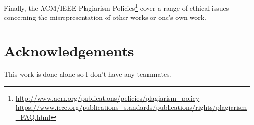 \documentclass[conference]{IEEEtran}
\begin{document}
Finally, the ACM/IEEE Plagiarism Policies\footnote{\url{http://www.acm.org/publications/policies/plagiarism_policy}\\
\url{https://www.ieee.org/publications_standards/publications/rights/plagiarism_FAQ.html}}
cover a range of ethical issues concerning the misrepresentation of
other works or one's own work. 


\section*{Acknowledgements}
This work is done alone so I don't have any teammates.





\end{document}
